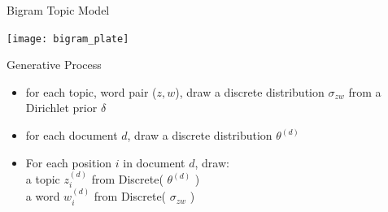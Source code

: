 \documentclass[10pt, svgnames]{beamer}
\begin{document}
\begin{frame}{Bigram Topic Model \cite{btm}}
	\begin{minipage}{0.45\linewidth}
		\begin{center}
			\texttt{[image: bigram\_plate]}
			\end{center}
		\end{minipage}
		\begin{minipage}{0.5\linewidth}
			Generative Process
			\begin{itemize}
				\item for each topic, word pair ($z,w$), draw a discrete distribution
					$\sigma_{zw}$ from a Dirichlet prior $\delta$\\
					\pause
				\item for each document $d$, draw a discrete distribution
					$\theta^{(d)}$ \\
					\pause
					\item For each position $i$ in document $d$, draw: \\
						\footnotesize{a topic $z_i^{(d)}$ from Discrete( $\theta^{(d)}$
						)} \\
						\footnotesize{a word $w_i^{(d)}$ from Discrete( $\sigma_{zw}$ )}
				\end{itemize}
			\end{minipage}
\end{frame}
\end{document}
